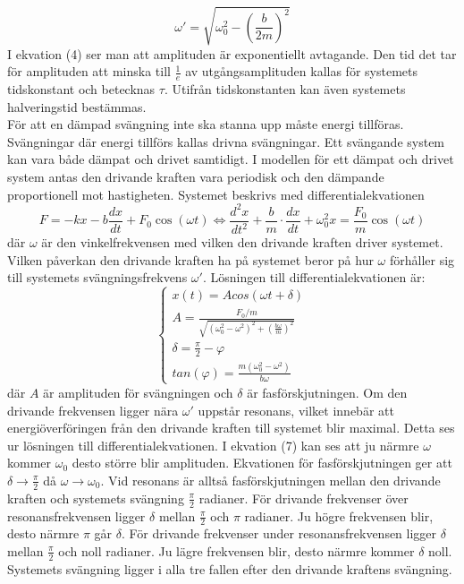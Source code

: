 \documentclass[a4paper,10pt]{article}
\begin{document}
\begin{equation}
	\omega' = \sqrt{\omega_0^2-(\frac{b}{2m})^2}
\end{equation}
I ekvation (4) ser man att amplituden är exponentiellt avtagande. Den tid det tar för amplituden att minska till $\frac{1}{e}$ av utgångsamplituden kallas för systemets tidskonstant och betecknas $\tau$. Utifrån tidskonstanten kan även systemets halveringstid bestämmas.
\\
\indent För att en dämpad svängning inte ska stanna upp måste energi tillföras. Svängningar där energi tillförs kallas drivna svängningar. Ett svängande system kan vara både dämpat och drivet samtidigt. I modellen för ett dämpat och drivet system antas den drivande kraften vara periodisk och den dämpande proportionell mot hastigheten. Systemet beskrivs med differentialekvationen
\begin{equation}
F = -kx - b\frac{dx}{dt} + F_0\cos(\omega t) \Longleftrightarrow\frac{d^2x}{dt^2} + \frac{b}{m}\cdot\frac{dx}{dt} + \omega_0^2x = \frac{F_0}{m} \cos(\omega t)
\end{equation}
där $\omega$ är den vinkelfrekvensen med vilken den drivande kraften driver systemet.
Vilken påverkan den drivande kraften ha på systemet beror på hur $\omega$ förhåller sig  till systemets svängningsfrekvens $\omega'$. Lösningen till differentialekvationen är:
\begin{equation}
\begin{cases}
	x(t) = Acos(\omega t + \delta) \\
	A = \frac{F_0/m}{\sqrt{(\omega_0^2 - \omega^2)^2 + (\frac{b\omega}{m})^2}} \\
	\delta = \frac{\pi}{2} - \varphi \\
	tan(\varphi) = \frac{m(\omega_0^2 - \omega^2)}{b\omega}
\end{cases}
\end{equation}
där $A$ är amplituden för svängningen och $\delta$ är fasförskjutningen. Om den drivande frekvensen ligger nära $\omega'$ uppstår resonans, vilket innebär att energiöverföringen från den drivande kraften till systemet blir maximal. Detta ses ur lösningen till differentialekvationen. I ekvation (7) kan ses att ju närmre $\omega$ kommer $\omega_0$ desto större blir amplituden. Ekvationen för fasförskjutningen ger att $\delta \rightarrow \frac{\pi}{2}$ då $\omega \rightarrow \omega_0$. Vid resonans är alltså fasförskjutningen mellan den drivande kraften och systemets svängning $\frac{\pi}{2}$ radianer. För drivande frekvenser över resonansfrekvensen ligger $\delta$ mellan $\frac{\pi}{2}$ och $\pi$ radianer. Ju högre frekvensen blir, desto närmre $\pi$ går $\delta$. För drivande frekvenser under resonansfrekvensen ligger $\delta$ mellan $\frac{\pi}{2}$ och noll radianer. Ju lägre frekvensen blir, desto närmre kommer $\delta$ noll. Systemets svängning ligger i alla tre fallen efter den drivande kraftens svängning.\\
\end{document}
